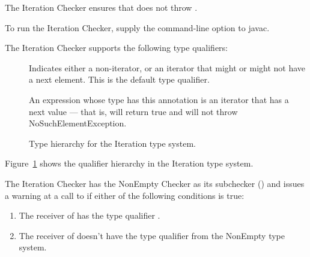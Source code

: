 \htmlhr
{}

The Iteration Checker ensures that
does not throw .

To run the Iteration Checker, supply the
command-line option to javac.

The Iteration Checker supports the following type qualifiers:
\begin{description}

    \item[]
    Indicates either a non-iterator, or an iterator that might or might not have a next element.
    This is the default type qualifier.

    \item[]
    An expression whose type has this annotation is an iterator that has a next value --- that is,
     will return true and
     will not throw NoSuchElementException.

\end{description}

\begin{figure}
    \caption{Type hierarchy for the Iteration type system.}
    \label{fig-iteration-hierarchy}
\end{figure}

Figure~\ref{fig-iteration-hierarchy} shows the qualifier hierarchy in the Iteration type system.


The Iteration Checker has the NonEmpty Checker as its subchecker ()
and issues a warning at a call to  if either of the
following conditions is true:

\begin{enumerate}
    \item The receiver of  has the type qualifier .
    \item The receiver of  doesn't have the type qualifier 
    from the NonEmpty type system.
\end{enumerate}

